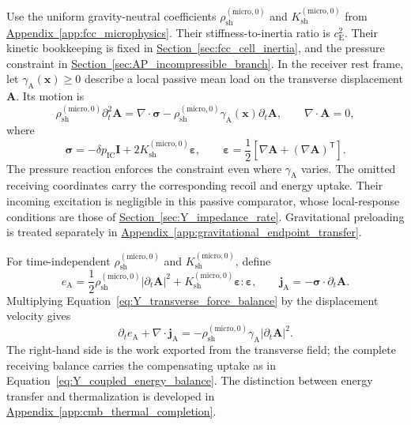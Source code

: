 Use the uniform gravity-neutral coefficients $\rho_{\mathrm{sh}}^{(\mathrm{micro},0)}$ and $K_{\mathrm{sh}}^{(\mathrm{micro},0)}$ from \hyperref[app:fcc_microphysics]{Appendix~\ref*{app:fcc_microphysics}}. Their stiffness-to-inertia ratio is $c_{\mathrm E}^2$. Their kinetic bookkeeping is fixed in \hyperref[sec:fcc_cell_inertia]{Section~\ref*{sec:fcc_cell_inertia}}, and the pressure constraint in \hyperref[sec:AP_incompressible_branch]{Section~\ref*{sec:AP_incompressible_branch}}. In the receiver rest frame, let $\gamma_{\mathrm A}(\mathbf x)\geq0$ describe a local passive mean load on the transverse displacement $\mathbf A$. Its motion is
\begin{equation}
    \rho_{\mathrm{sh}}^{(\mathrm{micro},0)}\partial_t^2\mathbf A
    =\nabla\cdot\boldsymbol\sigma
    -\rho_{\mathrm{sh}}^{(\mathrm{micro},0)}\gamma_{\mathrm A}(\mathbf x)\partial_t\mathbf A,
    \qquad \nabla\cdot\mathbf A=0,
    \label{eq:Y_transverse_force_balance}
\end{equation}
where
\begin{equation}
    \boldsymbol\sigma=-\delta p_{\mathrm{IC}}\mathbf I
    +2K_{\mathrm{sh}}^{(\mathrm{micro},0)}\boldsymbol\varepsilon,
    \qquad
    \boldsymbol\varepsilon
    =\frac12\left[\nabla\mathbf A+(\nabla\mathbf A)^{\mathsf T}\right].
\end{equation}
The pressure reaction enforces the constraint even where $\gamma_{\mathrm A}$ varies. The omitted receiving coordinates carry the corresponding recoil and energy uptake. Their incoming excitation is negligible in this passive comparator, whose local-response conditions are those of \hyperref[sec:Y_impedance_rate]{Section~\ref*{sec:Y_impedance_rate}}. Gravitational preloading is treated separately in \hyperref[app:gravitational_endpoint_transfer]{Appendix~\ref*{app:gravitational_endpoint_transfer}}.

For time-independent $\rho_{\mathrm{sh}}^{(\mathrm{micro},0)}$ and $K_{\mathrm{sh}}^{(\mathrm{micro},0)}$, define
\begin{equation}
    e_{\mathrm A}=\frac12\rho_{\mathrm{sh}}^{(\mathrm{micro},0)}|\partial_t\mathbf A|^2
    +K_{\mathrm{sh}}^{(\mathrm{micro},0)}\boldsymbol\varepsilon:\boldsymbol\varepsilon,
    \qquad
    \mathbf j_{\mathrm A}=-\boldsymbol\sigma\cdot\partial_t\mathbf A.
\end{equation}
Multiplying Equation~\eqref{eq:Y_transverse_force_balance} by the displacement velocity gives
\begin{equation}
    \boxed{
    \partial_te_{\mathrm A}+\nabla\cdot\mathbf j_{\mathrm A}
    =-\rho_{\mathrm{sh}}^{(\mathrm{micro},0)}\gamma_{\mathrm A}|\partial_t\mathbf A|^2
    }.
    \label{eq:Y_transverse_energy_balance}
\end{equation}
The right-hand side is the work exported from the transverse field; the complete receiving balance carries the compensating uptake as in Equation~\eqref{eq:Y_coupled_energy_balance}. The distinction between energy transfer and thermalization is developed in \hyperref[app:cmb_thermal_completion]{Appendix~\ref*{app:cmb_thermal_completion}}.


